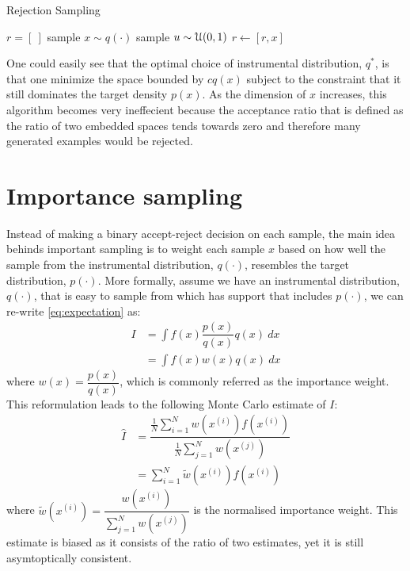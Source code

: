 \begin{algorithm}
\caption{Rejection Sampling}\label{algo:rejectionsampling}
\begin{algorithmic}[1]
\State $r = [\ ]$
\Repeat
  \State sample $x \sim q(\cdot)$
  \State sample $u \sim {\cal U}(0,1)$
    \State $r \gets [r,x]$
  \EndIf
{}
\EndFunction
\end{algorithmic}
\end{algorithm}

One could easily see that the optimal choice of instrumental distribution, $q^*$, is that one minimize the space bounded by $cq(x)$ subject to the constraint that it still dominates the target density $p(x)$. As the dimension of $x$ increases, this algorithm becomes very ineffecient because the acceptance ratio that is defined as the ratio of two embedded spaces tends towards zero and therefore many generated examples would be rejected. 

\section{Importance sampling}
\label{sec:IS}
Instead of making a binary accept-reject decision on each sample, the main idea behinds important sampling is to weight each sample $x$ based on how well the sample from the instrumental distribution, $q(\cdot)$, resembles the target distribution, $p(\cdot)$. More formally, assume we have an instrumental distribution, $q(\cdot)$, that is easy to sample from which has support that includes $p(\cdot)$, we can re-write \eqref{eq:expectation} as:
\begin{align}
  I &= \int f(x)\dfrac{p(x)}{q(x)}q(x)~dx \nonumber \\
    &= \int f(x)w(x)q(x)~dx
\end{align}
where $w(x)=\dfrac{p(x)}{q(x)}$, which is commonly referred as the importance weight. This reformulation leads to the following Monte Carlo estimate of $I$:
\begin{align}
  \hat{I} &= \dfrac{\frac{1}{N} \sum^N_{i=1} w(x^{(i)})f(x^{(i)})}{\frac{1}{N} \sum^N_{j=1} w(x^{(j)})} \nonumber \\ 
          &= \sum^N_{i=1} \tilde{w}(x^{(i)}) f(x^{(i)}) \label{eq:is}
\end{align}
where $\tilde{w}(x^{(i)})=\dfrac{w(x^{(i)})}{\sum^N_{j=1}w(x^{(j)})}$ is the normalised importance weight. This estimate is biased as it consists of the ratio of two estimates, yet it is still asymtoptically consistent.

